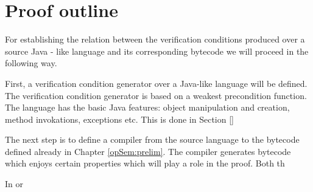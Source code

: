 \section{Proof outline}\label{pogEquiv:outline}


For establishing the relation between the verification conditions
produced over a source Java - like language and its corresponding
bytecode we will proceed in the following way. 

First, a verification condition generator  over a Java-like language will
be defined. The verification condition generator is based on a weakest precondition function. The language has the basic Java features: object manipulation
 and creation, method invokations, exceptions etc. This is done in Section 
\ref{}

The next step is to define a compiler from the source language to 
the bytecode defined already in Chapter \ref{opSem:prelim}. The compiler 
generates bytecode which enjoys certain properties which will play 
a role in the proof. Both th

In or
 

